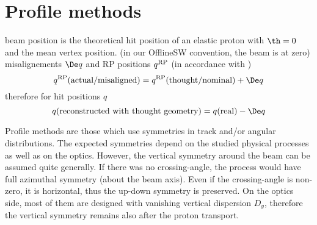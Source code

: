 



\section[al prof]{Profile methods}

\> beam position is the theoretical hit position of an elastic proton with $\th = 0$ and the mean vertex position.
\> (in our OfflineSW convention, the beam is at zero)
\> misalignements $\De q$ and RP positions $q^{\rm RP}$ (in accordance with )
$$q^{\rm RP}(\hbox{actual/misaligned}) = q^{\rm RP}(\hbox{thought/nominal}) + \De q$$
therefore for hit positions $q$
$$q(\hbox{reconstructed with thought geometry}) = q(\hbox{real}) - \De q$$

Profile methods are those which use symmetries in track and/or angular distributions. The expected symmetries depend on the studied physical processes as well as on the optics. However, the vertical symmetry around the beam can be assumed quite generally. If there was no crossing-angle, the process would have full azimuthal symmetry (about the beam axis). Even if the crossing-angle is non-zero, it is horizontal, thus the up-down symmetry is preserved. On the optics side, most of them are designed with vanishing vertical dispersion $D_y$, therefore the vertical symmetry remains also after the proton transport.

